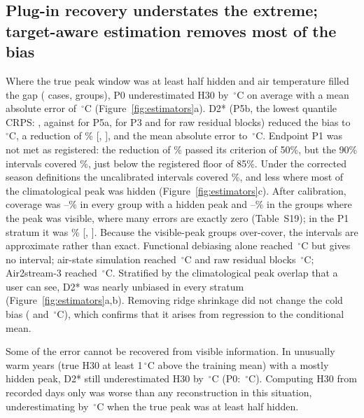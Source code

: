 \documentclass[draft]{agujournal2025}
\begin{document}
\subsection{Plug-in recovery understates the extreme; target-aware estimation removes most of the bias}
Where the true peak window was at least half hidden and air temperature filled the gap (\TPOneN{} cases, \TPOneGroups{} groups), P0 underestimated H30 by \TPOneBiasPZeroAbs\,$^{\circ}$C on average with a mean absolute error of \TPOneMaePZero\,$^{\circ}$C (Figure~\ref{fig:estimators}a). D2* (P5b, the lowest quantile CRPS: \TCrpsPFiveB, against \TCrpsPFiveA{} for P5a, \TCrpsPThree{} for P3 and \TCrpsPThreeRaw{} for raw residual blocks) reduced the bias to \TPOneBiasCal\,$^{\circ}$C, a reduction of \TPOneReductionCal\% [\TPOneReductionCalLow, \TPOneReductionCalHigh], and the mean absolute error to \TPOneMae\,$^{\circ}$C. Endpoint P1 was not met as registered: the reduction of \TPOneReductionRone\% passed its criterion of 50\%, but the 90\% intervals covered \TPOneCoverageRone\%, just below the registered floor of 85\%. Under the corrected season definitions the uncalibrated intervals covered \TPOneCoverage\%, and less where most of the climatological peak was hidden (Figure~\ref{fig:estimators}c). After calibration, coverage was \TCqrHardMin--\TCqrHardMax\% in every group with a hidden peak and \TCqrEasyMin--\TCqrEasyMax\% in the groups where the peak was visible, where many errors are exactly zero (Table~S19); in the P1 stratum it was \TPOneCoverageCal\% [\TPOneCoverageCalLow, \TPOneCoverageCalHigh]. Because the visible-peak groups over-cover, the intervals are approximate rather than exact. Functional debiasing alone reached \TPOneBiasPTwo\,$^{\circ}$C but gives no interval; air-state simulation reached \TPOneBiasPThree\,$^{\circ}$C and raw residual blocks \TPOneBiasPThreeRaw\,$^{\circ}$C; Air2stream-3 reached \TAirTwoStreamBias\,$^{\circ}$C. Stratified by the climatological peak overlap that a user can see, D2* was nearly unbiased in every stratum (Figure~\ref{fig:estimators}a,b). Removing ridge shrinkage did not change the cold bias (\TShrinkRidge{} and \TShrinkOls\,$^{\circ}$C), which confirms that it arises from regression to the conditional mean.

Some of the error cannot be recovered from visible information. In unusually warm years (true H30 at least 1\,$^{\circ}$C above the training mean) with a mostly hidden peak, D2* still underestimated H30 by \TWarmAnomBiasDTwoAbs\,$^{\circ}$C (P0: \TWarmAnomBiasPZeroAbs\,$^{\circ}$C). Computing H30 from recorded days only was worse than any reconstruction in this situation, underestimating by \TObsDaysBiasHiddenAbs\,$^{\circ}$C when the true peak was at least half hidden.
\end{document}
